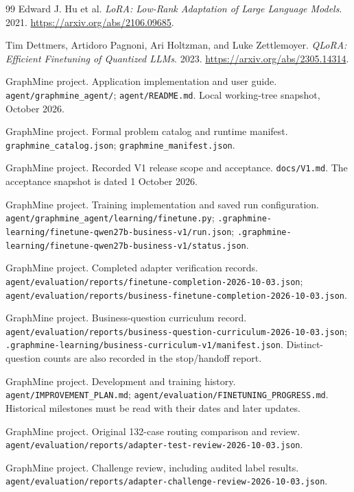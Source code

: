 \documentclass[11pt,a4paper]{article}
\newcommand{\pathref}[1]{\nolinkurl{#1}}
\begin{document}
\begin{thebibliography}{99}
\small
{}
Edward J. Hu et al.
\emph{LoRA: Low-Rank Adaptation of Large Language Models}. 2021.
\url{https://arxiv.org/abs/2106.09685}.

Tim Dettmers, Artidoro Pagnoni, Ari Holtzman, and Luke Zettlemoyer.
\emph{QLoRA: Efficient Finetuning of Quantized LLMs}. 2023.
\url{https://arxiv.org/abs/2305.14314}.

GraphMine project. Application implementation and user guide.
\pathref{agent/graphmine_agent/}; \pathref{agent/README.md}.
Local working-tree snapshot, October 2026.

GraphMine project. Formal problem catalog and runtime manifest.
\pathref{graphmine_catalog.json}; \pathref{graphmine_manifest.json}.

GraphMine project. Recorded V1 release scope and acceptance.
\pathref{docs/V1.md}. The acceptance snapshot is dated 1 October 2026.

GraphMine project. Training implementation and saved run configuration.
\pathref{agent/graphmine_agent/learning/finetune.py};
\pathref{.graphmine-learning/finetune-qwen27b-business-v1/run.json};
\pathref{.graphmine-learning/finetune-qwen27b-business-v1/status.json}.

GraphMine project. Completed adapter verification records.
\pathref{agent/evaluation/reports/finetune-completion-2026-10-03.json};
\pathref{agent/evaluation/reports/business-finetune-completion-2026-10-03.json}.

GraphMine project. Business-question curriculum record.
\pathref{agent/evaluation/reports/business-question-curriculum-2026-10-03.json};
\pathref{.graphmine-learning/business-curriculum-v1/manifest.json}.
Distinct-question counts are also recorded in the stop/handoff report.

GraphMine project. Development and training history.
\pathref{agent/IMPROVEMENT_PLAN.md};
\pathref{agent/evaluation/FINETUNING_PROGRESS.md}.
Historical milestones must be read with their dates and later updates.

GraphMine project. Original 132-case routing comparison and review.
\pathref{agent/evaluation/reports/adapter-test-review-2026-10-03.json}.

GraphMine project. Challenge review, including audited label results.
\pathref{agent/evaluation/reports/adapter-challenge-review-2026-10-03.json}.


\end{thebibliography}
\end{document}
